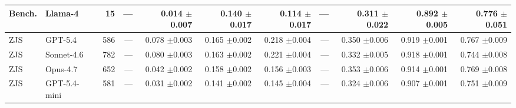 \begin{table}[t]
{\begin{tabular}{llrrrrrrrrr}
Bench. & Llama-4 & 15 & --- & \shortstack[r]{0.014\\{\scriptsize $\pm$0.007}} & \shortstack[r]{0.140\\{\scriptsize $\pm$0.017}} & \shortstack[r]{0.114\\{\scriptsize $\pm$0.017}} & --- & \shortstack[r]{0.311\\{\scriptsize $\pm$0.022}} & \shortstack[r]{0.892\\{\scriptsize $\pm$0.005}} & \shortstack[r]{0.776\\{\scriptsize $\pm$0.051}} \\
\midrule
ZJS & GPT-5.4 & 586 & --- & \shortstack[r]{0.078\\{\scriptsize $\pm$0.003}} & \shortstack[r]{0.165\\{\scriptsize $\pm$0.002}} & \shortstack[r]{0.218\\{\scriptsize $\pm$0.004}} & --- & \shortstack[r]{0.350\\{\scriptsize $\pm$0.006}} & \shortstack[r]{0.919\\{\scriptsize $\pm$0.001}} & \shortstack[r]{0.767\\{\scriptsize $\pm$0.009}} \\
ZJS & Sonnet-4.6 & 782 & --- & \shortstack[r]{0.080\\{\scriptsize $\pm$0.003}} & \shortstack[r]{0.163\\{\scriptsize $\pm$0.002}} & \shortstack[r]{0.221\\{\scriptsize $\pm$0.004}} & --- & \shortstack[r]{0.332\\{\scriptsize $\pm$0.005}} & \shortstack[r]{0.918\\{\scriptsize $\pm$0.001}} & \shortstack[r]{0.744\\{\scriptsize $\pm$0.008}} \\
ZJS & Opus-4.7 & 652 & --- & \shortstack[r]{0.042\\{\scriptsize $\pm$0.002}} & \shortstack[r]{0.158\\{\scriptsize $\pm$0.002}} & \shortstack[r]{0.156\\{\scriptsize $\pm$0.003}} & --- & \shortstack[r]{0.353\\{\scriptsize $\pm$0.006}} & \shortstack[r]{0.914\\{\scriptsize $\pm$0.001}} & \shortstack[r]{0.769\\{\scriptsize $\pm$0.008}} \\
ZJS & GPT-5.4-mini & 581 & --- & \shortstack[r]{0.031\\{\scriptsize $\pm$0.002}} & \shortstack[r]{0.141\\{\scriptsize $\pm$0.002}} & \shortstack[r]{0.145\\{\scriptsize $\pm$0.004}} & --- & \shortstack[r]{0.324\\{\scriptsize $\pm$0.006}} & \shortstack[r]{0.907\\{\scriptsize $\pm$0.001}} & \shortstack[r]{0.751\\{\scriptsize $\pm$0.009}} \\

\end{tabular}}
\end{table}
